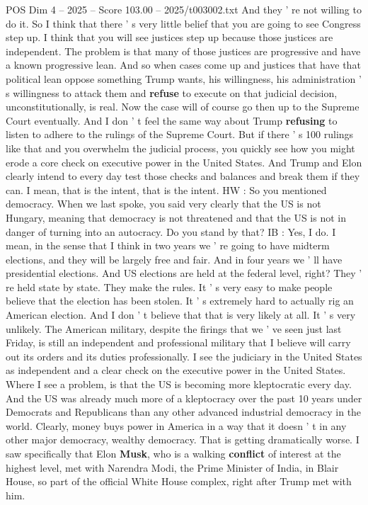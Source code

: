 \begin{textsample}{POS Dim 4 – 2025 – Score 103.00 – 2025/t003002.txt}
And they ' re not willing to do it.
So I think that there ' s very little belief that you are going to see Congress step up.
I think that you will see justices step up because those justices are independent.
The problem is that many of those justices are progressive and have a known progressive lean.
And so when cases come up and justices that have that political lean oppose something Trump wants, his willingness, his administration ' s willingness to attack them and \textbf{refuse} to execute on that judicial decision, unconstitutionally, is real.
Now the case will of course go then up to the Supreme Court eventually.
And I don ' t feel the same way about Trump \textbf{refusing} to listen to adhere to the rulings of the Supreme Court.
But if there ' s 100 rulings like that and you overwhelm the judicial process, you quickly see how you might erode a core check on executive power in the United States.
And Trump and Elon clearly intend to every day test those checks and balances and break them if they can.
I mean, that is the intent, that is the intent.
HW : So you mentioned democracy.
When we last spoke, you said very clearly that the US is not Hungary, meaning that democracy is not threatened and that the US is not in danger of turning into an autocracy.
Do you stand by that?
IB : Yes, I do.
I mean, in the sense that I think in two years we ' re going to have midterm elections, and they will be largely free and fair.
And in four years we ' ll have presidential elections.
And US elections are held at the federal level, right?
They ' re held state by state.
They make the rules.
It ' s very easy to make people believe that the election has been stolen.
It ' s extremely hard to actually rig an American election.
And I don ' t believe that that is very likely at all.
It ' s very unlikely.
The American military, despite the firings that we ' ve seen just last Friday, is still an independent and professional military that I believe will carry out its orders and its duties professionally.
I see the judiciary in the United States as independent and a clear check on the executive power in the United States.
Where I see a problem, is that the US is becoming more kleptocratic every day.
And the US was already much more of a kleptocracy over the past 10 years under Democrats and Republicans than any other advanced industrial democracy in the world.
Clearly, money buys power in America in a way that it doesn ' t in any other major democracy, wealthy democracy.
That is getting dramatically worse.
I saw specifically that Elon \textbf{Musk}, who is a walking \textbf{conflict} of interest at the highest level, met with Narendra Modi, the Prime Minister of India, in Blair House, so part of the official White House complex, right after Trump met with him.

\end{textsample}
